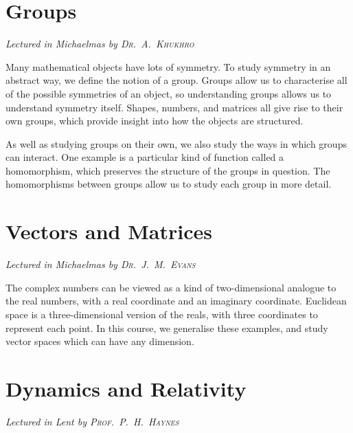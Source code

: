

\chapter[Groups \\ \textnormal{\emph{Lectured in Michaelmas \oldstylenums{2020} by \textsc{Dr.\ A.\ Khukhro}}}]{Groups}
\emph{\Large Lectured in Michaelmas  by \textsc{Dr.\ A.\ Khukhro}}

Many mathematical objects have lots of symmetry.
To study symmetry in an abstract way, we define the notion of a group.
Groups allow us to characterise all of the possible symmetries of an object, so understanding groups allows us to understand symmetry itself.
Shapes, numbers, and matrices all give rise to their own groups, which provide insight into how the objects are structured.

As well as studying groups on their own, we also study the ways in which groups can interact.
One example is a particular kind of function called a homomorphism, which preserves the structure of the groups in question.
The homomorphisms between groups allow us to study each group in more detail.



\chapter[Vectors and Matrices \\ \textnormal{\emph{Lectured in Michaelmas \oldstylenums{2020} by \textsc{Dr.\ J.\ M.\ Evans}}}]{Vectors and Matrices}
\emph{\Large Lectured in Michaelmas  by \textsc{Dr.\ J.\ M.\ Evans}}

The complex numbers can be viewed as a kind of two-dimensional analogue to the real numbers, with a real coordinate and an imaginary coordinate.
Euclidean space is a three-dimensional version of the reals, with three coordinates to represent each point.
In this course, we generalise these examples, and study vector spaces which can have any dimension.



\chapter[Dynamics and Relativity \\ \textnormal{\emph{Lectured in Lent \oldstylenums{2021} by \textsc{Prof.\ P.\ H.\ Haynes}}}]{Dynamics and Relativity}
\emph{\Large Lectured in Lent  by \textsc{Prof.\ P.\ H.\ Haynes}}


